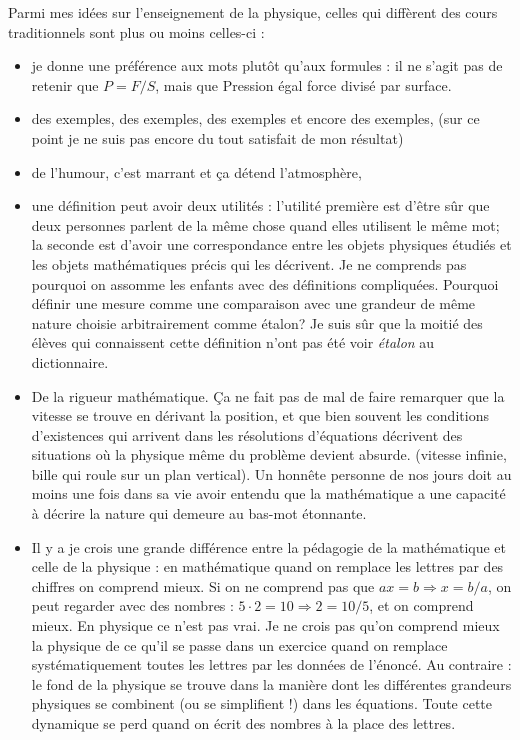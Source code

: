 Parmi mes idées sur l'enseignement de la physique, celles qui diffèrent des cours \og traditionnels\fg{} sont plus ou moins celles-ci :
\begin{itemize}
\item je donne une préférence aux mots plutôt qu'aux formules : il ne s'agit pas de retenir que $P=F/S$, mais que \og Pression égal force divisé par surface\fg.
\item des exemples, des exemples, des exemples et encore des exemples, (sur ce point je ne suis pas encore du tout satisfait de mon résultat)
\item de l'humour, c'est marrant et ça détend l'atmosphère,
\item une définition peut avoir deux utilités : l'utilité première est d'être sûr que deux personnes parlent de la même chose quand elles utilisent le même mot; la seconde est d'avoir une correspondance entre les objets physiques étudiés et les objets mathématiques précis qui les décrivent. Je ne comprends pas pourquoi on assomme les enfants avec des définitions compliquées. Pourquoi définir une \og mesure\fg{} comme une \og comparaison avec une grandeur de même nature choisie arbitrairement comme étalon\fg ? Je suis sûr que la moitié des élèves qui connaissent cette définition n'ont pas été voir \emph{étalon} au dictionnaire.
\item De la rigueur mathématique. Ça ne fait pas de mal de faire remarquer que la vitesse se trouve en dérivant la position, et que bien souvent les conditions d'existences qui arrivent dans les résolutions d'équations décrivent des situations où la physique même du problème devient absurde. (vitesse infinie, bille qui roule sur un plan vertical). Un honnête personne de nos jours doit au moins une fois dans sa vie avoir entendu que la mathématique a une capacité à décrire la nature qui demeure au bas-mot étonnante.
\item Il y a je crois une grande différence entre la pédagogie de la mathématique et celle de la physique : en mathématique quand on remplace les lettres par des chiffres on comprend mieux. Si on ne comprend pas que $ax=b\Rightarrow x=b/a$, on peut regarder avec des nombres : $5\cdot 2=10\Rightarrow 2=10/5$, et on comprend mieux. En physique ce n'est pas vrai. Je ne crois pas qu'on comprend mieux la physique de ce qu'il se passe dans un exercice quand on remplace systématiquement toutes les lettres par les données de l'énoncé. Au contraire : le fond de la physique se trouve dans la manière dont les différentes grandeurs physiques se combinent (ou se simplifient !) dans les équations. Toute cette dynamique se perd quand on écrit des nombres à la place des lettres.

\end{itemize}
